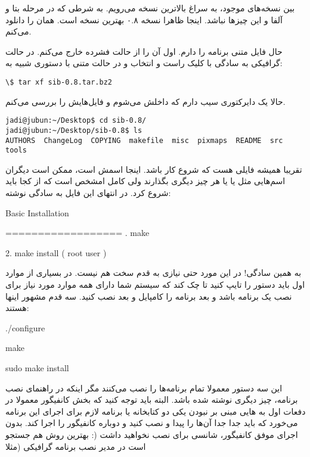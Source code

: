 بین نسخه‌های موجود، به سراغ بالاترین نسخه می‌رویم. به شرطی که در مرحله بتا و آلفا و این چیزها نباشد. اینجا ظاهرا نسخه ۰.۸ بهترین نسخه است.
همان را دانلود می‌کنم.

حال فایل متنی برنامه را دارم. اول آن را از حالت فشرده خارج می‌کنم. در حالت گرافیکی به سادگی با کلیک راست و انتخاب 
 و در حالت متنی با دستوری شبیه به:
\begin{frameng}
\begin{lstlisting}
\$ tar xf sib-0.8.tar.bz2
\end{lstlisting}
\end{frameng}
حالا یک دایرکتوری سیب دارم که داخلش می‌شوم و فایل‌هایش را بررسی می‌کنم.
\begin{frameng}
\begin{lstlisting}
jadi@jubun:~/Desktop$ cd sib-0.8/
jadi@jubun:~/Desktop/sib-0.8$ ls
AUTHORS  ChangeLog  COPYING  makefile  misc  pixmaps  README  src  tools
\end{lstlisting}
\end{frameng}
تقریبا همیشه فایلی هست که شروع کار باشد. اینجا اسمش 
 است، ممکن است دیگران اسم‌هایی مثل 
 یا 
 یا هر چیز دیگری بگذارند ولی کامل امشخص است که از کجا باید شروع کرد. در انتهای این فایل به سادگی نوشته:
\begin{frameng}
Basic Installation

==================
\newline
{}. make  

2. make install ( root user )
\end{frameng}
به همین سادگی! در این مورد حتی نیازی به قدم سخت 
 هم نیست. در بسیاری از موارد اول باید دستور 
 را تایپ کنید تا چک کند که سیستم شما دارای همه موارد مورد نیاز برای نصب یک برنامه باشد و بعد برنامه را کامپایل و بعد نصب کنید. سه قدم مشهور اینها هستند:
\begin{frameng}
./configure

make

sudo make install
\end{frameng}
این سه دستور معمولا تمام برنامه‌ها را نصب می‌کنند مگر اینکه در راهنمای نصب برنامه، چیز دیگری نوشته شده باشد. البته باید توجه کنید که بخش کانفیگور معمولا در دفعات اول به 
هایی مبنی بر نبودن یکی دو کتابخانه یا برنامه لازم برای اجرای این برنامه می‌خورد که باید جدا جدا آن‌ها را پیدا و نصب کنید و دوباره کانفیگور را اجرا کند. بدون اجرای موفق کانفیگور، شانسی برای نصب نخواهید داشت (: بهترین روش هم جستجو است در مدیر نصب برنامه گرافیکی (مثلا 
